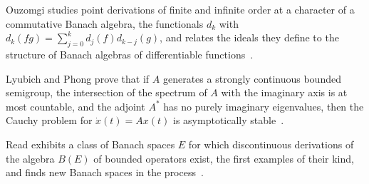 Ouzomgi studies point derivations of finite and infinite order at a character of a commutative Banach algebra, the functionals $d_k$ with $d_k(fg)=\sum_{j=0}^{k}d_j(f)d_{k-j}(g)$, and relates the ideals they define to the structure of Banach algebras of differentiable functions~\cite{WlPointDerivationsAndIdealsInBan1989}.

Lyubich and Phong prove that if $A$ generates a strongly continuous bounded semigroup, the intersection of the spectrum of $A$ with the imaginary axis is at most countable, and the adjoint $A^*$ has no purely imaginary eigenvalues, then the Cauchy problem for $\dot{x}(t)=Ax(t)$ is asymptotically stable~\cite{WlAsymptoticStabilityOfLinearDif1988}.

Read exhibits a class of Banach spaces $E$ for which discontinuous derivations of the algebra $B(E)$ of bounded operators exist, the first examples of their kind, and finds new Banach spaces in the process~\cite{WlDiscontinuousDerivationsOnTheA1989}.


